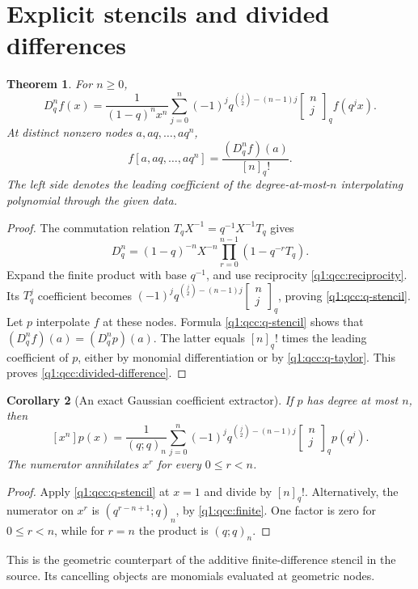 \documentclass[11pt,a4paper,oneside,openany]{book}
\newtheorem{theorem}{Theorem}[chapter]
\newtheorem{corollary}[theorem]{Corollary}
\theoremstyle{definition}
\theoremstyle{remark}
\newcommand{\GB}[3][q]{\begin{bmatrix}#2\\#3\end{bmatrix}_{#1}}
\newcommand{\qf}[2][q]{[#2]_{#1}!}
\begin{document}
\section{Explicit stencils and divided differences}
\begin{theorem}\label{q1:qcc:stencil}
For \(n\ge0\),
\begin{equation}\label{q1:qcc:q-stencil}
 D_q^nf(x)=\frac1{(1-q)^nx^n}
 \sum_{j=0}^n(-1)^j q^{\binom j2-(n-1)j}\GB nj f(q^jx).
\end{equation}
At distinct nonzero nodes \(a,aq,\ldots,aq^n\),
\begin{equation}\label{q1:qcc:divided-difference}
 f[a,aq,\ldots,aq^n]=\frac{(D_q^nf)(a)}{\qf n}.
\end{equation}
The left side denotes the leading coefficient of the degree-at-most-\(n\)
interpolating polynomial through the given data.
\end{theorem}
\begin{proof}
The commutation relation \(T_qX^{-1}=q^{-1}X^{-1}T_q\) gives
\[
 D_q^n=(1-q)^{-n}X^{-n}\prod_{r=0}^{n-1}(1-q^{-r}T_q).
\]
Expand the finite product with base \(q^{-1}\), and use reciprocity
\eqref{q1:qcc:reciprocity}. Its \(T_q^j\) coefficient becomes
\((-1)^jq^{\binom j2-(n-1)j}\GB nj\), proving
\eqref{q1:qcc:q-stencil}.
Let \(p\) interpolate \(f\) at these nodes. Formula \eqref{q1:qcc:q-stencil}
shows that \((D_q^nf)(a)=(D_q^np)(a)\). The latter equals \([n]_q!\) times
the leading coefficient of \(p\), either by monomial differentiation or by
\cref{q1:qcc:q-taylor}. This proves \eqref{q1:qcc:divided-difference}.
\end{proof}

\begin{corollary}[An exact Gaussian coefficient extractor]\label{q1:qcc:extractor}
If \(p\) has degree at most \(n\), then
\begin{equation}\label{q1:qcc:extractor-formula}
 [x^n]p(x)=\frac1{(q;q)_n}
 \sum_{j=0}^n(-1)^j q^{\binom j2-(n-1)j}\GB nj p(q^j).
\end{equation}
The numerator annihilates \(x^r\) for every \(0\le r<n\).
\end{corollary}
\begin{proof}
Apply \eqref{q1:qcc:q-stencil} at \(x=1\) and divide by \([n]_q!\).
Alternatively, the numerator on \(x^r\) is
\((q^{r-n+1};q)_n\), by \eqref{q1:qcc:finite}. One factor is zero for
\(0\le r<n\), while for \(r=n\) the product is \((q;q)_n\).
\end{proof}
This is the geometric counterpart of the additive finite-difference stencil in
the source. Its cancelling objects are monomials evaluated at geometric nodes.
\end{document}
